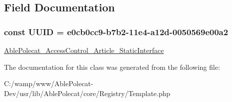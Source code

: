 \subsection{Field Documentation}
\hypertarget{class_able_polecat___registry___template_a74b892c8c0b86bf9d04c5819898c51e7}{}
\subsubsection[{U\+U\+I\+D}]{\setlength{\rightskip}{0pt plus 5cm}const U\+U\+I\+D = \textquotesingle{}e0cb0cc9-\/b7b2-\/11e4-\/a12d-\/0050569e00a2\textquotesingle{}}\label{class_able_polecat___registry___template_a74b892c8c0b86bf9d04c5819898c51e7}
\hyperlink{interface_able_polecat___access_control___article___static_interface}{Able\+Polecat\+\_\+\+Access\+Control\+\_\+\+Article\+\_\+\+Static\+Interface} 

The documentation for this class was generated from the following file\+:\begin{DoxyCompactItemize}
\item 
C\+:/wamp/www/\+Able\+Polecat-\/\+Dev/usr/lib/\+Able\+Polecat/core/\+Registry/Template.\+php\end{DoxyCompactItemize}

